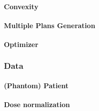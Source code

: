 \paragraph{Convexity}

\paragraph{Multiple Plans Generation}

\paragraph{Optimizer}

\subsubsection{Data}
\paragraph{(Phantom) Patient}

\paragraph{Dose normalization}

